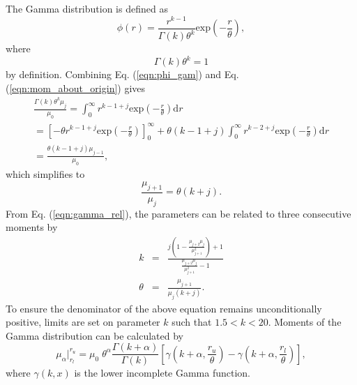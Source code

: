 \documentclass[a4paper,10pt]{article}
\begin{document}
The Gamma distribution is defined as
\begin{equation} \label{eqn:phi_gam}
\phi(r) = \frac{r^{k-1}}{\Gamma(k) \theta^{k}} \mathrm{exp} \left( - \frac{r}{\theta} \right),
\end{equation}
where
\begin{equation}
\Gamma(k) \theta^{k} = 1
\end{equation}
by definition.  Combining Eq. (\ref{eqn:phi_gam}) and Eq. (\ref{eqn:mom_about_origin}) gives
\begin{multline}
\frac{\Gamma(k) \theta^{k} \mu_{j}}{\mu_{0}} = \int_0^{\infty} r^{k-1+j}
\mathrm{exp} \left(- \frac{r}{\theta} \right) \mathrm{d} r \\
= \left[ -\theta r^{k-1+j} \mathrm{exp} \left(- \frac{r}{\theta} \right) \right]_0^{\infty}
+ \theta (k-1+j) \int_0^{\infty} r^{k-2+j} \mathrm{exp} \left(- \frac{r}{\theta} \right) \mathrm{d} r \\
= \frac{\theta (k-1+j) \mu_{j-1}}{\mu_{0}},
\end{multline}
which simplifies to
\begin{equation} \label{eqn:gamma_rel}
\frac{\mu_{j+1}}{\mu_{j}} = \theta (k + j).
\end{equation}
From Eq. (\ref{eqn:gamma_rel}), the parameters can be related to three consecutive moments by
\begin{eqnarray}
k &=& \frac{j \left(1-\frac{\mu_{j+2}\mu_{j}}{\mu_{j+1}^2} \right)+1}{\frac{\mu_{j+2}\mu_{j}}{\mu_{j+1}^2}-1} \\
\theta &=& \frac{\mu_{j+1}}{\mu_{j}(k+j)}.
\end{eqnarray}
To ensure the denominator of the above equation remains unconditionally positive, limits are set on parameter $k$ such that $1.5 < k < 20$. Moments of the Gamma distribution can be calculated by
\begin{equation} \label{eqn:ingammom}
\mu_{\alpha} \vert_{r_{l}}^{r_{u}} = \mu_{0} \; \theta^{\alpha} \frac{\Gamma(k+\alpha)}{\Gamma(k)}
\left[ \gamma \left(k+\alpha,\frac{r_{u}}{\theta}\right) - \gamma \left(k+\alpha,\frac{r_{l}}{\theta}\right) \right],
\end{equation}
where $\gamma(k,x)$ is the lower incomplete Gamma function.



\end{document}
